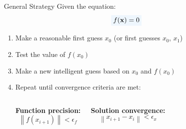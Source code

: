 \documentclass[aspectratio=169]{beamer}
\newcommand{\highlight}[2]{\colorbox{#1!9}{$#2$}}
\begin{document}
\begin{frame}{General Strategy}
    Given the equation:
    \begin{equation*}
        \highlight{accentcolor}{f(\mathbf{x}) = 0}
    \end{equation*}
    
    \vspace{0.5em}
    
    \begin{enumerate}
        \item Make a reasonable first guess $x_{0}$ (or first guesses $x_0$, $x_1$)
            
        \item Test the value of $f(x_{0})$
            
        \item Make a new \alert{intelligent} guess based on $x_{0}$ and $f(x_{0})$
            
        \item Repeat until convergence criteria are met:
        
        \vspace{0.3em}
        \begin{columns}[t]
            \textcolor{accentcolor}{\textbf{Function precision:}}
            \begin{equation*}
                \left\lVert f(x_{i+1}) \right\rVert < \epsilon_{f}
            \end{equation*}
            
            \textcolor{accentcolor}{\textbf{Solution convergence:}}
            \begin{equation*}
                \left\lVert x_{i+1} - x_{i} \right\rVert < \epsilon_{x}
            \end{equation*}
        \end{columns}
    \end{enumerate}
\end{frame}
\end{document}
